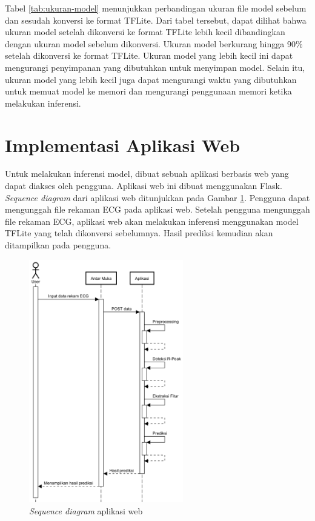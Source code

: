 Tabel \ref{tab:ukuran-model} menunjukkan perbandingan ukuran file model sebelum dan sesudah konversi ke format TFLite.
Dari tabel tersebut, dapat dilihat bahwa ukuran model setelah dikonversi ke format TFLite lebih kecil dibandingkan dengan ukuran model sebelum dikonversi.
Ukuran model berkurang hingga 90\% setelah dikonversi ke format TFLite.
Ukuran model yang lebih kecil ini dapat mengurangi penyimpanan yang dibutuhkan untuk menyimpan model.
Selain itu, ukuran model yang lebih kecil juga dapat 
mengurangi waktu yang dibutuhkan untuk memuat model ke memori dan
mengurangi penggunaan memori ketika melakukan inferensi.



\section{Implementasi Aplikasi Web}

Untuk melakukan inferensi model, dibuat sebuah aplikasi berbasis web yang dapat diakses oleh pengguna.
Aplikasi web ini dibuat menggunakan Flask.
\textit{Sequence diagram} dari aplikasi web ditunjukkan pada Gambar \ref{fig:alur-kerja-aplikasi-web}.
Pengguna dapat mengunggah file rekaman ECG pada aplikasi web.
Setelah pengguna mengunggah file rekaman ECG, aplikasi web akan melakukan inferensi menggunakan model TFLite yang telah dikonversi sebelumnya.
Hasil prediksi kemudian akan ditampilkan pada pengguna.

\begin{figure}[H]
  \centering
  \includegraphics[width=0.6\textwidth]{img/sequence.png}
  \caption{\textit{Sequence diagram} aplikasi web}
  \label{fig:alur-kerja-aplikasi-web}
\end{figure}

